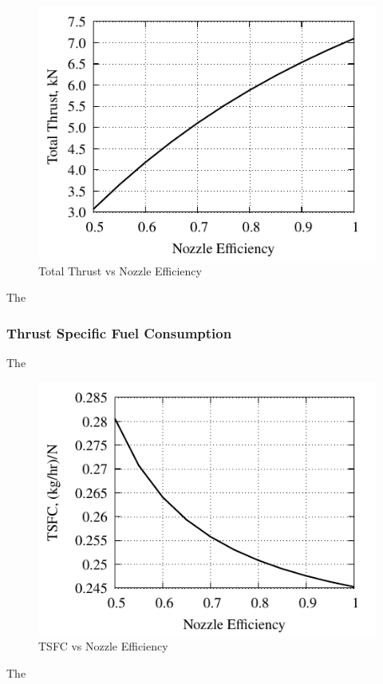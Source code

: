 \documentclass[conf]{new-aiaa} %
\begin{document}
\begin{figure}[H] %
    \centering
    \includegraphics[]{media/performance_parameter_files/part_g_T.pdf}
    \caption{\label{fig:partgt}Total Thrust vs Nozzle Efficiency}
\end{figure}
The

\subsubsection{Thrust Specific Fuel Consumption}
The

\begin{figure}[H] %
    \centering
    \includegraphics[]{media/performance_parameter_files/part_g_TSFC.pdf}
    \caption{\label{fig:partgtsfc}TSFC vs Nozzle Efficiency}
\end{figure}
The
\end{document}
